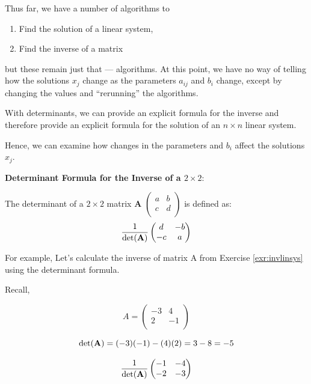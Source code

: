 \documentclass[
]{book}
\providecommand{\tightlist}{%
  \setlength{\itemsep}{0pt}\setlength{\parskip}{0pt}}
\theoremstyle{definition}
\theoremstyle{definition}
\theoremstyle{definition}
\theoremstyle{remark}
\begin{document}
Thus far, we have a number of algorithms to

\begin{enumerate}
\def\labelenumi{\arabic{enumi}.}
\tightlist
\item
  Find the solution of a linear system,
\item
  Find the inverse of a matrix
\end{enumerate}

but these remain just that --- algorithms. At this point, we have no way of telling how the solutions \(x_j\) change as the parameters \(a_{ij}\) and \(b_i\) change, except by changing the values and ``rerunning'' the algorithms.

With determinants, we can provide an explicit formula for the inverse and
therefore provide an explicit formula for the solution of an \(n\times n\) linear system.

Hence, we can examine how changes in the parameters and \(b_i\) affect the solutions \(x_j\).

\textbf{Determinant Formula for the Inverse of a \(2 \times 2\)}:

The determinant of a \(2 \times 2\) matrix \textbf{A} \(\begin{pmatrix} a & b\\ c & d\\ \end{pmatrix}\) is defined as:
\[\frac{1}{\det({\bf A})} \begin{pmatrix}
            d & -b\\
            -c & a\\
        \end{pmatrix}\]

For example, Let's calculate the inverse of matrix A from Exercise \ref{exr:invlinsys} using the determinant formula.

Recall,

\[A = \begin{pmatrix}
            -3 & 4\\
            2 & -1\\
        \end{pmatrix}\]

\[\det({\bf A}) = (-3)(-1) - (4)(2) = 3 - 8  = -5\]

\[\frac{1}{\det({\bf A})} \begin{pmatrix}
            -1 & -4\\
            -2 & -3\\
        \end{pmatrix}\]
\end{document}
